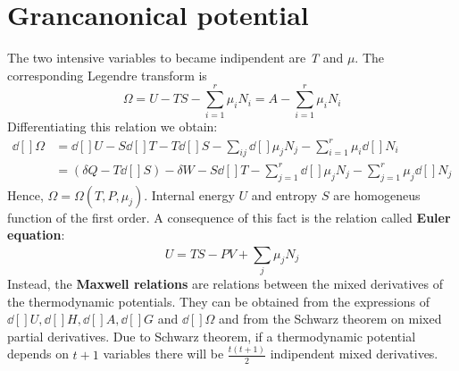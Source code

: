 \documentclass[../main/main.tex]{subfiles}
\begin{document}
\section{Grancanonical potential}
The two intensive variables to became indipendent are \emph{T} and \( \mu  \). The corresponding Legendre transform is
\begin{equation}
  \Omega = U -T S - \sum_{i=1}^{r} \mu _i N _i = A - \sum_{i=1}^{r}  \mu _i N _ i
  \label{eq:}
\end{equation}
Differentiating this relation we obtain:
\begin{equation}
\begin{split}
\dd[]{\Omega }   &=  \dd[]{U} - S \dd[]{T} - T \dd[]{S} - \sum_{ij}^{} \dd[]{\mu _j} N_j - \sum_{i=1}^{r} \mu _i \dd[]{N_i}           \\
& = (\delta Q - T \dd[]{S}) - \delta W - S \dd[]{T} - \sum_{j=1}^{r} \dd[]{\mu _j} N_j - \sum_{j=1}^{r} \mu _j \dd[]{N_j}
\end{split}
  \label{eq:}
\end{equation}
Hence, \( \Omega = \Omega (T,P,{\mu _j}) \).
Internal energy $U$ and entropy $S$ are homogeneus function of the first order. A consequence of this fact is the relation called \textbf{Euler equation}:
\begin{equation}
  U = T S - P V + \sum_{j}^{} \mu _j N_j
  \label{eq:}
\end{equation}
Instead, the \textbf{Maxwell relations} are relations between the mixed derivatives of the thermodynamic potentials. They can be obtained from the expressions of \( \dd[]{U},\dd[]{H} ,\dd[]{A}, \dd[]{G}    \)  and \( \dd[]{\Omega }  \) and from the Schwarz theorem on mixed partial derivatives.
Due to Schwarz theorem, if a thermodynamic potential depends on \( t+1 \) variables there will be \( \frac{t(t+1)}{2} \)  indipendent mixed derivatives.
\end{document}
